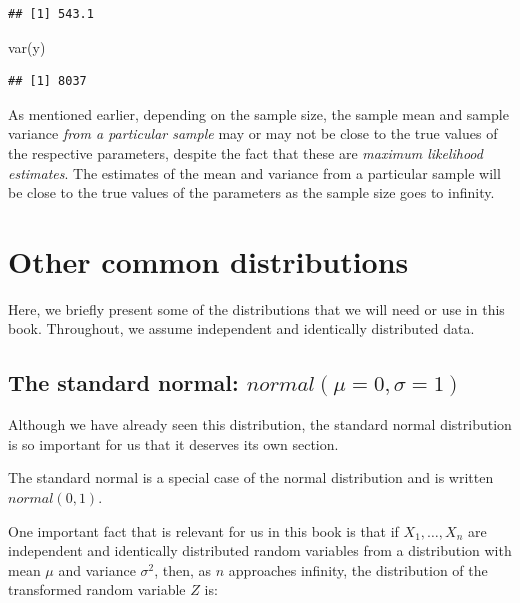\documentclass[
  12pt,
]{krantz}
\newenvironment{Shaded}{\begin{snugshade}}{\end{snugshade}}
\newcommand{\FunctionTok}[1]{\textcolor[rgb]{0.00,0.00,0.00}{#1}}
\newcommand{\NormalTok}[1]{#1}
\theoremstyle{definition}
\theoremstyle{definition}
\theoremstyle{definition}
\theoremstyle{definition}
\theoremstyle{remark}
\begin{document}
\begin{verbatim}
## [1] 543.1
\end{verbatim}

\begin{Shaded}
\begin{Highlighting}[]
\FunctionTok{var}\NormalTok{(y)}
\end{Highlighting}
\end{Shaded}

\begin{verbatim}
## [1] 8037
\end{verbatim}

As mentioned earlier, depending on the sample size, the sample mean and sample variance \emph{from a particular sample} may or may not be close to the true values of the respective parameters, despite the fact that these are \emph{maximum likelihood estimates}. The estimates of the mean and variance from a particular sample will be close to the true values of the parameters as the sample size goes to infinity.

\hypertarget{other-common-distributions}{%
\section{Other common distributions}\label{other-common-distributions}}

Here, we briefly present some of the distributions that we will need or use in this book. Throughout, we assume independent and identically distributed data.

\hypertarget{the-standard-normal-mathitnormalmu0sigma1}{%
\subsection{\texorpdfstring{The standard normal: \(\mathit{normal}(\mu=0,\sigma=1)\)}{The standard normal: \textbackslash mathit\{normal\}(\textbackslash mu=0,\textbackslash sigma=1)}}\label{the-standard-normal-mathitnormalmu0sigma1}}

Although we have already seen this distribution, the standard normal distribution is so important for us that it deserves its own section.

The standard normal is a special case of the normal distribution and is written \(\mathit{normal}(0,1)\).

One important fact that is relevant for us in this book is that if \(X_1, \dots, X_n\) are independent and identically distributed random variables from a distribution with mean \(\mu\) and variance \(\sigma^2\), then, as \(n\) approaches infinity, the distribution of the transformed random variable \(Z\) is:
\end{document}
